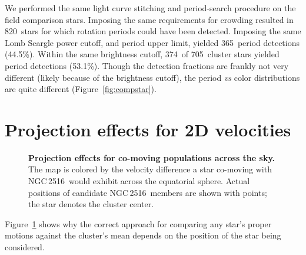 \documentclass[12pt,twocolumn,tighten]{aastex63}
\newcommand{\cn}{NGC\,2516} %
\newcommand{\ncompstardenominator}{820} %
\newcommand{\ncompstarnumerator}{365} %
\newcommand{\ncompfrac}{44.5\%} %
\newcommand{\nautovscompstardenominator}{705} %
\newcommand{\nautovscompstarnumerator}{374} %
\newcommand{\nautofrac}{53.1\%} %
\begin{document}
We performed the same light curve stitching and period-search
procedure on the field comparison stars.
Imposing the same requirements for crowding resulted in
\ncompstardenominator\ stars for which rotation periods could have been
detected.
Imposing the same Lomb Scargle power cutoff, and period upper limit,
yielded \ncompstarnumerator\ period detections (\ncompfrac).
Within the same brightness cutoff, 
\nautovscompstarnumerator\ of \nautovscompstardenominator\ cluster stars
yielded period detections (\nautofrac).
Though the detection fractions are frankly not very different
(likely because of the brightness cutoff), the period {\it
vs} color distributions are quite different
(Figure~\ref{fig:compstar}).


\section{Projection effects for 2D velocities}
\label{app:vproj}

\begin{figure}[t]
	\begin{center}
		\leavevmode

	\end{center}
	\vspace{-0.7cm}
  \caption{ {\bf Projection effects for co-moving populations across
  the sky.} The map is colored by the velocity difference a star
  co-moving with \cn\ would exhibit across the equatorial sphere.
  Actual positions of candidate \cn\ members are shown with points;
  the star denotes the cluster center.
	\label{fig:vproj}
	}
\end{figure}

Figure~\ref{fig:vproj} shows why the correct approach for comparing
any star's proper motions against the cluster's mean depends on the
position of the star being considered.
\end{document}
